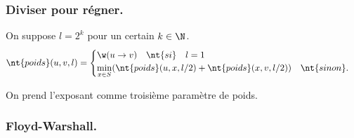 \documentclass[french, 11pt]{article}
\begin{document}
\subsubsection{Diviser pour régner.}

\begin{defi}{}{}
    On suppose $l=2^k$ pour un certain $k\in\N$.
    \begin{equation*}
        \nt{poids}(u,v,l)=\begin{cases}
            \w(u\to v) \quad \nt{si} \quad l=1\\
            \min\limits_{x\in S}(\nt{poids}(u,x,l/2)+\nt{poids}(x,v,l/2)) \quad \nt{sinon}.
        \end{cases}
    \end{equation*}
\end{defi}

\begin{defi}{}{}
    On prend l'exposant comme troisième paramètre de poids.\\
    \begin{algorithm}[H]
        \caption{Poids minimal pour toutes les paires.}
    \end{algorithm}
\end{defi}

\subsubsection{Floyd-Warshall.}
\end{document}
